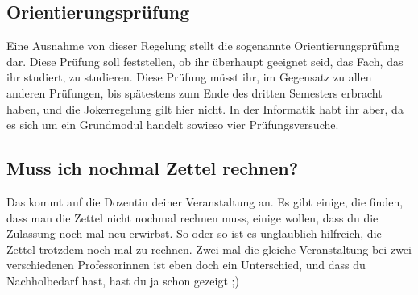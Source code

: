 \subsection{Orientierungsprüfung}
Eine Ausnahme von dieser Regelung stellt die sogenannte Orientierungsprüfung dar. Diese Prüfung soll feststellen, ob ihr überhaupt geeignet seid, das Fach, das ihr studiert, zu studieren. Diese Prüfung müsst ihr, im Gegensatz zu allen anderen Prüfungen, bis spätestens zum Ende des dritten Semesters erbracht haben, und die Jokerregelung gilt hier nicht. In der Informatik habt ihr aber, da es sich um ein Grundmodul handelt sowieso vier Prüfungsversuche.

\subsection{Muss ich nochmal Zettel rechnen?}
Das kommt auf die Dozentin deiner Veranstaltung an. Es gibt einige, die finden, dass man die Zettel nicht nochmal rechnen muss, einige wollen, dass du die Zulassung noch mal neu erwirbst. So oder so ist es unglaublich hilfreich, die Zettel trotzdem noch mal zu rechnen. Zwei mal die gleiche Veranstaltung bei zwei verschiedenen Professorinnen ist eben doch ein Unterschied, und dass du Nachholbedarf hast, hast du ja schon gezeigt ;)
